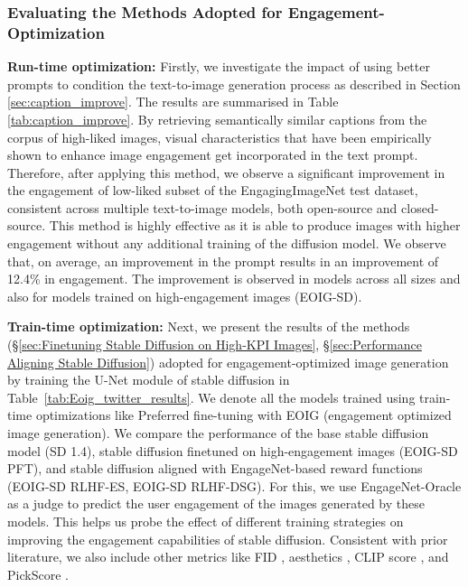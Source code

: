  
 
 
 \subsubsection{Evaluating the Methods Adopted for Engagement-Optimization}
 \textbf{Run-time optimization:}
 Firstly, we investigate the impact of using better prompts to condition the text-to-image generation process as described in Section \ref{sec:caption_improve}. The results are summarised in Table \ref{tab:caption_improve}. By retrieving semantically similar captions from the corpus of high-liked images, visual characteristics that have been empirically shown to enhance image engagement get incorporated in the text prompt.
 Therefore, after applying this method, we observe a significant improvement in the engagement of low-liked subset of the EngagingImageNet test dataset, consistent across multiple text-to-image models, both open-source and closed-source. This method is highly effective as it is able to produce images with higher engagement without any additional training of the diffusion model. 
We observe that, on average, an improvement in the prompt results in an improvement of 12.4\% in engagement. The improvement is observed in models across all sizes and also for models trained on high-engagement images (EOIG-SD). %
 

 
 \textbf{Train-time optimization:}
 Next, we present the results of the methods (\S\ref{sec:Finetuning Stable Diffusion on High-KPI Images}, \S\ref{sec:Performance Aligning Stable Diffusion}) adopted for engagement-optimized image generation by training the U-Net module of stable diffusion in Table~\ref{tab:Eoig_twitter_results}. We denote all the models trained using train-time optimizations like Preferred fine-tuning with EOIG (engagement optimized image generation). We compare the performance of the base stable diffusion model (SD 1.4), stable diffusion finetuned on high-engagement images (EOIG-SD PFT), and stable diffusion aligned with EngageNet-based reward functions (EOIG-SD RLHF-ES, EOIG-SD RLHF-DSG). For this, we use EngageNet-Oracle as a judge to predict the user engagement of the images generated by these models. This helps us probe the effect of different training strategies on improving the engagement capabilities of stable diffusion. Consistent with prior literature, we also include other metrics like FID \cite{heusel2017gans}, aesthetics \cite{schuhmann2022laion}, CLIP score \cite{radford2021learning}, and PickScore \cite{kirstain2023pick}. 


